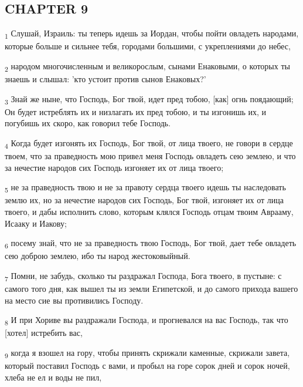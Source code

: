 \subsection{CHAPTER 9}
\begin{tcolorbox}
\textsubscript{1} Слушай, Израиль: ты теперь идешь за Иордан, чтобы пойти овладеть народами, которые больше и сильнее тебя, городами большими, с укреплениями до небес,
\end{tcolorbox}
\begin{tcolorbox}
\textsubscript{2} народом многочисленным и великорослым, сынами Енаковыми, о которых ты знаешь и слышал: 'кто устоит против сынов Енаковых?'
\end{tcolorbox}
\begin{tcolorbox}
\textsubscript{3} Знай же ныне, что Господь, Бог твой, идет пред тобою, [как] огнь поядающий; Он будет истреблять их и низлагать их пред тобою, и ты изгонишь их, и погубишь их скоро, как говорил тебе Господь.
\end{tcolorbox}
\begin{tcolorbox}
\textsubscript{4} Когда будет изгонять их Господь, Бог твой, от лица твоего, не говори в сердце твоем, что за праведность мою привел меня Господь овладеть сею землею, и что за нечестие народов сих Господь изгоняет их от лица твоего;
\end{tcolorbox}
\begin{tcolorbox}
\textsubscript{5} не за праведность твою и не за правоту сердца твоего идешь ты наследовать землю их, но за нечестие народов сих Господь, Бог твой, изгоняет их от лица твоего, и дабы исполнить слово, которым клялся Господь отцам твоим Аврааму, Исааку и Иакову;
\end{tcolorbox}
\begin{tcolorbox}
\textsubscript{6} посему знай, что не за праведность твою Господь, Бог твой, дает тебе овладеть сею доброю землею, ибо ты народ жестоковыйный.
\end{tcolorbox}
\begin{tcolorbox}
\textsubscript{7} Помни, не забудь, сколько ты раздражал Господа, Бога твоего, в пустыне: с самого того дня, как вышел ты из земли Египетской, и до самого прихода вашего на место сие вы противились Господу.
\end{tcolorbox}
\begin{tcolorbox}
\textsubscript{8} И при Хориве вы раздражали Господа, и прогневался на вас Господь, так что [хотел] истребить вас,
\end{tcolorbox}
\begin{tcolorbox}
\textsubscript{9} когда я взошел на гору, чтобы принять скрижали каменные, скрижали завета, который поставил Господь с вами, и пробыл на горе сорок дней и сорок ночей, хлеба не ел и воды не пил,
\end{tcolorbox}
